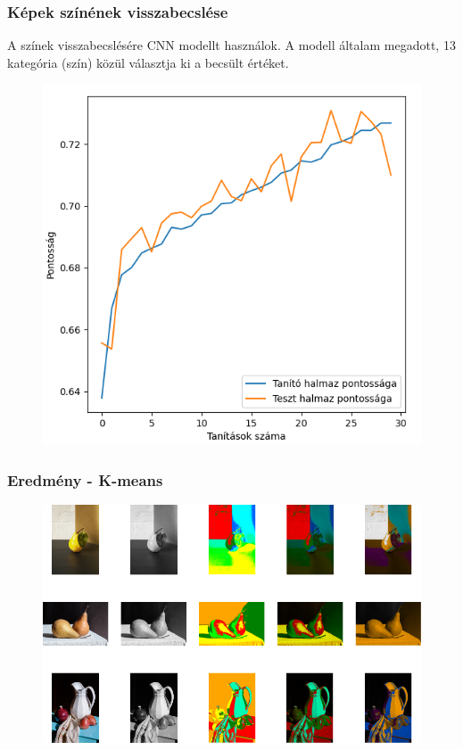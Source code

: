 \documentclass{beamer}
\begin{document}
\begin{frame}[fragile]
\frametitle{Képek színének visszabecslése}
A színek visszabecslésére CNN modellt használok. A modell általam megadott, 13 kategória (szín) közül választja ki a becsült értéket.

\begin{figure}[!tbp]
  \centering
  \begin{minipage}[b]{0.58\textwidth}
    \includegraphics[width=\textwidth]{images/cnn_accuracy.png}
  \end{minipage}
\end{figure}
\end{frame}

\begin{frame}[fragile]
\frametitle{Eredmény - K-means}

\begin{figure}[!tbp]
  \centering
  \begin{minipage}[b]{0.9\textwidth}
    \includegraphics[width=\textwidth]{images/result_all_kmeans.png}
  \end{minipage}
\end{figure}

\end{frame}
\end{document}
